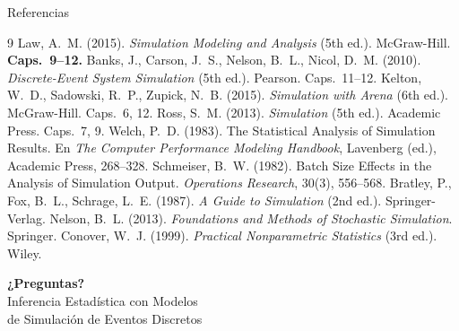\documentclass[aspectratio=1610, 10pt]{beamer}
\begin{document}
\begin{frame}{Referencias}
\footnotesize
\begin{thebibliography}{9}
 Law, A.\ M. (2015). \textit{Simulation Modeling and Analysis} (5th ed.). McGraw-Hill. \textbf{Caps.\ 9--12.}
 Banks, J., Carson, J.\ S., Nelson, B.\ L., Nicol, D.\ M. (2010). \textit{Discrete-Event System Simulation} (5th ed.). Pearson. Caps.\ 11--12.
 Kelton, W.\ D., Sadowski, R.\ P., Zupick, N.\ B. (2015). \textit{Simulation with Arena} (6th ed.). McGraw-Hill. Caps.\ 6, 12.
 Ross, S.\ M. (2013). \textit{Simulation} (5th ed.). Academic Press. Caps.\ 7, 9.
 Welch, P.\ D. (1983). The Statistical Analysis of Simulation Results. En \textit{The Computer Performance Modeling Handbook}, Lavenberg (ed.), Academic Press, 268--328.
 Schmeiser, B.\ W. (1982). Batch Size Effects in the Analysis of Simulation Output. \textit{Operations Research}, 30(3), 556--568.
 Bratley, P., Fox, B.\ L., Schrage, L.\ E. (1987). \textit{A Guide to Simulation} (2nd ed.). Springer-Verlag.
 Nelson, B.\ L. (2013). \textit{Foundations and Methods of Stochastic Simulation}. Springer.
 Conover, W.\ J. (1999). \textit{Practical Nonparametric Statistics} (3rd ed.). Wiley.
\end{thebibliography}
\end{frame}

\begin{frame}
\begin{center}
\Huge \textcolor{mobiblue}{\textbf{¿Preguntas?}}\\[0.5cm]
\large Inferencia Estadística con Modelos\\ de Simulación de Eventos Discretos
\end{center}
\end{frame}
\end{document}
